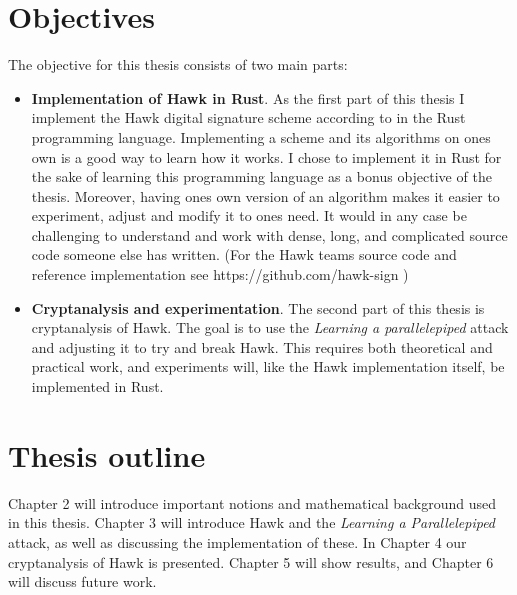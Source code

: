 \section{Objectives}
The objective for this thesis consists of two main parts:
\begin{itemize}
    \item \textbf{Implementation of Hawk in Rust}. As the first part of this thesis I implement the Hawk digital signature scheme according to \cite{HawkSpec24} in the Rust programming language. 
    Implementing a scheme and its algorithms on ones own is a good way to learn how it works. I chose to implement it in Rust for the sake of learning this programming language as a bonus objective of the thesis.
    Moreover, having ones own version of an algorithm makes it easier to experiment, adjust and modify it to ones need. It would in any case be challenging to understand and work with dense, long, 
    and complicated source code someone else has written. (For the Hawk teams source code and reference implementation see https://github.com/hawk-sign )

\item \textbf{Cryptanalysis and experimentation}. The second part of this thesis is cryptanalysis of Hawk. The goal is to use the \textit{Learning a parallelepiped} attack \cite{NR09} and adjusting it to try and break Hawk. 
    This requires both theoretical and practical work, and experiments will, like the Hawk implementation itself, be implemented in Rust.
\end{itemize}
\section{Thesis outline}
Chapter 2 will introduce important notions and mathematical background used in this thesis. Chapter 3 will introduce Hawk and the \textit{Learning a Parallelepiped} attack, as well as discussing the implementation of these.
In Chapter 4 our cryptanalysis of Hawk is presented. Chapter 5 will show results, and Chapter 6 will discuss future work.
